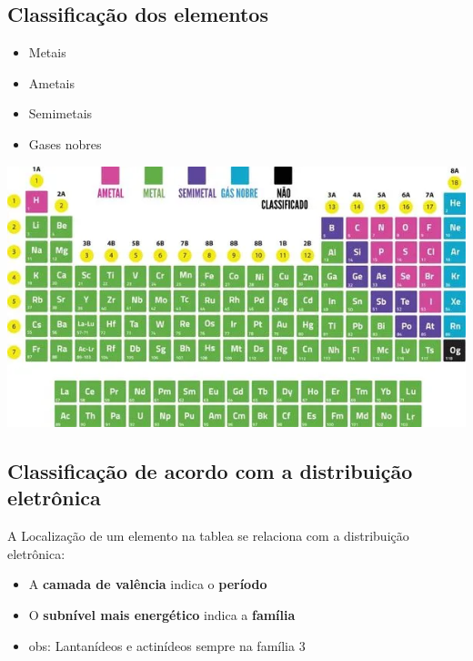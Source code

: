 \documentclass{article}
\begin{document}
\subsection{Classificação dos elementos}
\begin{itemize}
    \item Metais
    \item Ametais
    \item Semimetais
    \item Gases nobres
\end{itemize}

\begin{center}
    \includegraphics[width=1\textwidth]{tabela_periodica_categorias}
\end{center}

\subsection{Classificação de acordo com a distribuição eletrônica}

A Localização de um elemento na tablea se relaciona com a distribuição eletrônica:
\begin{itemize}
    \item A \textbf{camada de valência} indica o \textbf{período}
    \item O \textbf{subnível mais energético} indica a \textbf{família}
    \item obs: Lantanídeos e actinídeos sempre na família 3
\end{itemize}
\end{document}
